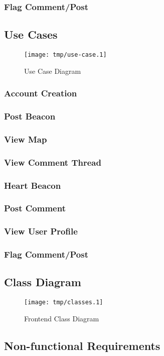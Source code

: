         \subsubsection{Flag Comment/Post}

    \subsection{Use Cases}
        \begin{figure}[H]
            \centering
            \texttt{[image: tmp/use-case.1]} 
            \caption{Use Case Diagram}
        \end{figure}

        \subsubsection{Account Creation}
        \subsubsection{Post Beacon}
        \subsubsection{View Map}
        \subsubsection{View Comment Thread}
        \subsubsection{Heart Beacon}
        \subsubsection{Post Comment}
        \subsubsection{View User Profile}
        \subsubsection{Flag Comment/Post}


    \subsection{Class Diagram}
        \begin{figure}[H]
            \centering
            \texttt{[image: tmp/classes.1]} 
            \caption{Frontend Class Diagram}
        \end{figure}

    \subsection{Non-functional Requirements}

